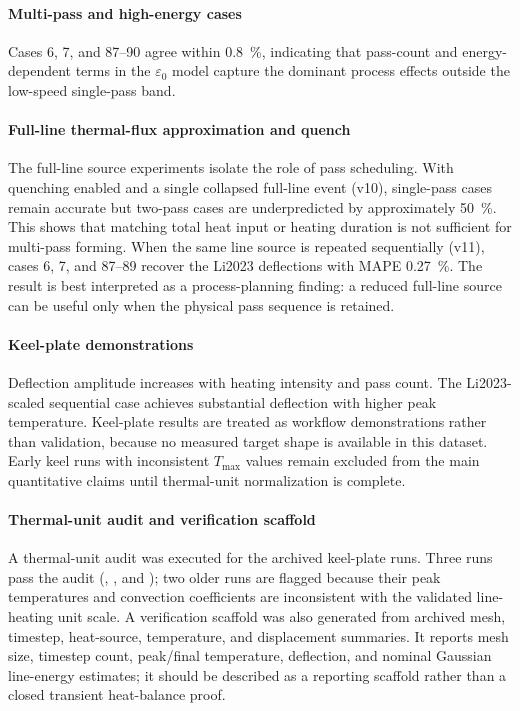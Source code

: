 \paragraph{Multi-pass and high-energy cases}
Cases 6, 7, and 87--90 agree within \SI{0.8}{\%}, indicating that pass-count and energy-dependent terms in the $\varepsilon_0$ model capture the dominant process effects outside the low-speed single-pass band.

\paragraph{Full-line thermal-flux approximation and quench}
The full-line source experiments isolate the role of pass scheduling. With quenching enabled and a single collapsed full-line event (v10), single-pass cases remain accurate but two-pass cases are underpredicted by approximately \SI{50}{\%}. This shows that matching total heat input or heating duration is not sufficient for multi-pass forming. When the same line source is repeated sequentially (v11), cases 6, 7, and 87--89 recover the Li2023 deflections with MAPE \SI{0.27}{\%}. The result is best interpreted as a process-planning finding: a reduced full-line source can be useful only when the physical pass sequence is retained.

\paragraph{Keel-plate demonstrations}
Deflection amplitude increases with heating intensity and pass count. The Li2023-scaled sequential case achieves substantial deflection with higher peak temperature. Keel-plate results are treated as workflow demonstrations rather than validation, because no measured target shape is available in this dataset. Early keel runs with inconsistent $T_{\max}$ values remain excluded from the main quantitative claims until thermal-unit normalization is complete.

\paragraph{Thermal-unit audit and verification scaffold}
A thermal-unit audit was executed for the archived keel-plate runs. Three runs pass the audit (, , and ); two older runs are flagged because their peak temperatures and convection coefficients are inconsistent with the validated line-heating unit scale. A verification scaffold was also generated from archived mesh, timestep, heat-source, temperature, and displacement summaries. It reports mesh size, timestep count, peak/final temperature, deflection, and nominal Gaussian line-energy estimates; it should be described as a reporting scaffold rather than a closed transient heat-balance proof.

